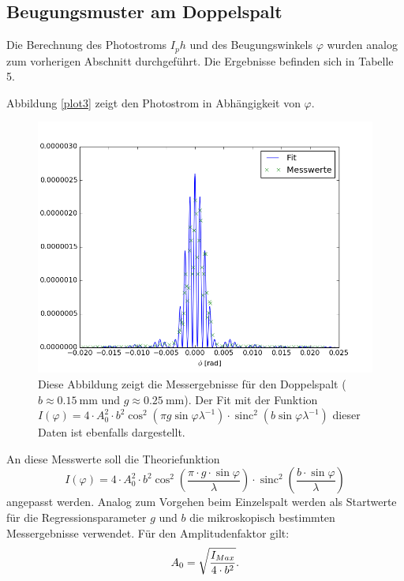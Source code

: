 \documentclass[11pt,ngerman,a4paper]{article}
\begin{document}
\subsection{Beugungsmuster am Doppelspalt}

Die Berechnung des Photostroms $I_ph$ und des Beugungswinkels $\varphi$ wurden analog zum vorherigen Abschnitt durchgeführt. Die Ergebnisse befinden sich in Tabelle 5.

\noindent
Abbildung \ref{plot3} zeigt den Photostrom in Abhängigkeit von $\varphi$.
\begin{figure}[H]
\centering
\includegraphics[scale=0.8]{plot2.png}
\caption{Diese Abbildung zeigt die Messergebnisse für den Doppelspalt ($b \approx \SI{0.15}{\milli\meter}$ und $g\approx \SI{0.25}{\milli\meter}$). Der Fit mit der Funktion $I(\varphi) = 4 \cdot A_0^2\cdot b^2\cos^2\left(\pi g  \sin \varphi\lambda^{-1}\right)\cdot \operatorname{sinc}^2\left(b\sin\varphi\lambda^{-1}\right)$  dieser Daten  ist ebenfalls dargestellt.}
\label{plot0}
\end{figure}
\noindent
An diese Messwerte soll die Theoriefunktion
\begin{equation}
I(\varphi) = 4 \cdot A_0^2\cdot b^2\cos^2\left(\frac{\pi\cdot g \cdot \sin \varphi}{\lambda}\right)\cdot \operatorname{sinc}^2\left( \frac{b\cdot\sin{\varphi}}{\lambda}\right)
\end{equation}
angepasst werden. Analog zum Vorgehen beim Einzelspalt werden als Startwerte für die Regressionsparameter $g$ und $b$ die mikroskopisch bestimmten Messergebnisse verwendet. Für den Amplitudenfaktor gilt:
\[
A_0 = \sqrt{\frac{I_{Max}}{4\cdot b^2}}\rm.
\]
\end{document}
